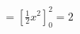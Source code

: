 \documentclass[preview]{standalone}
\begin{document}
\begin{align*}
= \left[ \frac{1}{2}x^2 \right]_0^2 = 2
\end{align*}
\end{document}
